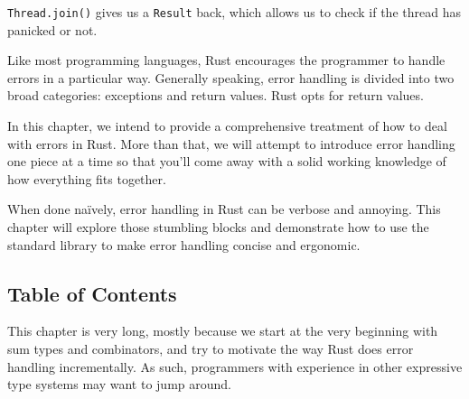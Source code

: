 \documentclass[a4paper,]{book}
\begin{document}
\texttt{Thread.join()} gives us a \texttt{Result} back, which allows us
to check if the thread has panicked or not.


Like most programming languages, Rust encourages the programmer to
handle errors in a particular way. Generally speaking, error handling is
divided into two broad categories: exceptions and return values. Rust
opts for return values.

In this chapter, we intend to provide a comprehensive treatment of how
to deal with errors in Rust. More than that, we will attempt to
introduce error handling one piece at a time so that you'll come away
with a solid working knowledge of how everything fits together.

When done naïvely, error handling in Rust can be verbose and annoying.
This chapter will explore those stumbling blocks and demonstrate how to
use the standard library to make error handling concise and ergonomic.

\subsection{Table of Contents}\label{table-of-contents}

This chapter is very long, mostly because we start at the very beginning
with sum types and combinators, and try to motivate the way Rust does
error handling incrementally. As such, programmers with experience in
other expressive type systems may want to jump around.
\end{document}

